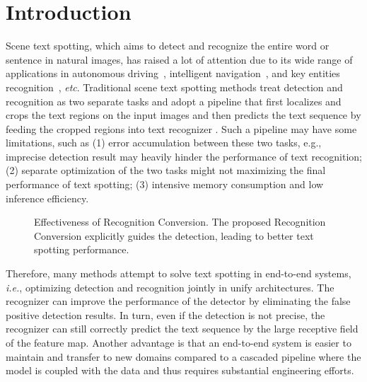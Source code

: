 \documentclass[10pt,twocolumn,letterpaper]{article}
\begin{document}
\section{Introduction}
\label{sec:intro}
Scene text spotting, which aims to detect and recognize the entire word or sentence in natural images, has raised a lot of attention due to its wide range of applications in autonomous driving~\cite{9551780}, intelligent navigation~\cite{wang2015bridging,rong2016guided}, and key entities recognition~\cite{zhang2020trie,wang2021towards}, \textit{etc}. Traditional scene text spotting methods treat detection and recognition as two separate tasks and adopt a pipeline that first localizes and crops the text regions on the input images and then predicts the text sequence by feeding the cropped regions into text recognizer \cite{jaderberg2016reading,liao2018textboxes++,jaderberg2014deep,neumann2015real,gomez2017textproposals}. Such a pipeline may have some limitations, such as (1) error accumulation between these two tasks, e.g., imprecise detection result may heavily hinder the performance of text recognition; 
(2) separate optimization of the two tasks might not maximizing the final performance of text spotting; 
(3) intensive memory consumption and low inference efficiency.

\begin{figure}[t!]
    \centering
        \caption{Effectiveness of Recognition Conversion. The proposed Recognition Conversion explicitly guides the detection, leading to better text spotting performance.
        }
    \label{fig:Compared with Recognition Conversion and without Recognition Conversion}
\end{figure}

Therefore, many methods \cite{li2017towards,he2018end,liu2018fots,lyu2018mask} attempt to solve text spotting in end-to-end systems, \textit{i.e.}, optimizing detection and recognition jointly in unify architectures.
The recognizer can improve the performance of the detector by eliminating the false positive detection results\cite{li2017towards,liao2019mask}. 
In turn, even if the detection is not precise, the recognizer can still correctly predict the text sequence by the large receptive field of the feature map\cite{liu2018fots,liao2019mask}. 
Another advantage is that an end-to-end system is easier to maintain and transfer to new domains compared to a cascaded pipeline where the model is coupled with the data and thus requires substantial engineering efforts\cite{liu2021abcnetv2,wang2021pan++}.
\end{document}
